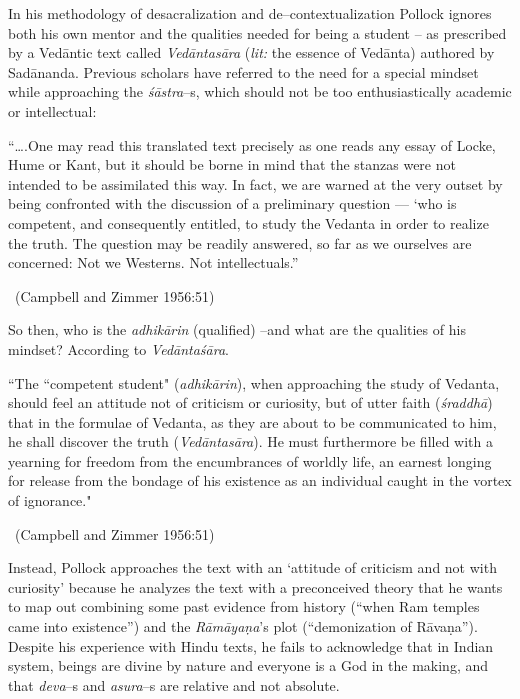 In his methodology of desacralization and de–contextualization Pollock ignores both his own mentor and the qualities needed for being a student – as prescribed by a Vedāntic text called \textit{Vedāntasāra} (\textit{lit:} the essence of Vedānta) authored by Sadānanda. Previous scholars have referred to the need for a special mindset while approaching the \textit{śāstra}–s, which should not be too enthusiastically academic or intellectual:

\begin{myquote}
“….One may read this translated text precisely as one reads any essay of Locke, Hume or Kant, but it should be borne in mind that the stanzas were not intended to be assimilated this way. In fact, we are warned at the very outset by being confronted with the discussion of a preliminary question — ‘who is competent, and consequently entitled, to study the Vedanta in order to realize the truth. The question may be readily answered, so far as we ourselves are concerned: Not we Westerns. Not intellectuals.” 

~\hfill (Campbell and Zimmer 1956:51)
\end{myquote}

So then, who is the \textit{adhikārin} (qualified) –and what are the qualities of his mindset? According to \textit{Vedāntaśāra}.

\begin{myquote}
“The “competent student" (\textit{adhikārin}), when approaching the study of Vedanta, should feel an attitude not of criticism or curiosity, but of utter faith (\textit{śraddhā}) that in the formulae of Vedanta, as they are about to be communicated to him, he shall discover the truth (\textit{Vedāntasāra}). He must furthermore be filled with a yearning for freedom from the encumbrances of worldly life, an earnest longing for release from the bondage of his existence as an individual caught in the vortex of ignorance." 

~\hfill (Campbell and Zimmer 1956:51)
\end{myquote}

Instead, Pollock approaches the text with an ‘attitude of criticism and not with curiosity’ because he analyzes the text with a preconceived theory that he wants to map out combining some past evidence from history (“when Ram temples came into existence”) and the \textit{Rāmāyaṇa}’s plot (“demonization of Rāvaṇa”). Despite his experience with Hindu texts, he fails to acknowledge that in Indian system, beings are divine by nature and everyone is a God in the making, and that \textit{deva}–s and \textit{asura}–s are relative and not absolute.


